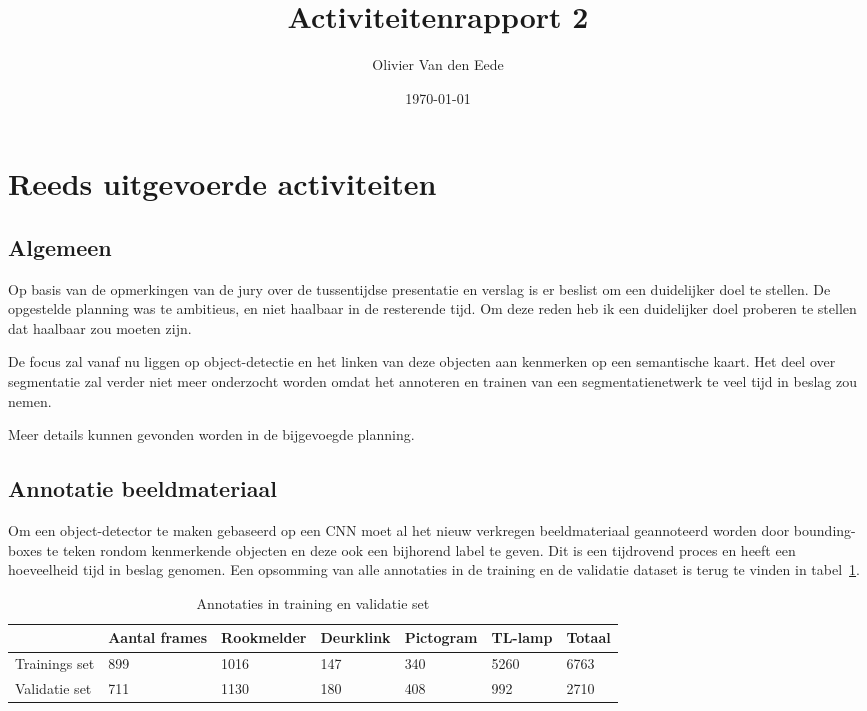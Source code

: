 \documentclass[11pt,a4paper]{article}
\title{Activiteitenrapport 2}
\author{Olivier Van den Eede}
\date{\today}
\begin{document}
    \maketitle
    
    \section{Reeds uitgevoerde activiteiten}
        \subsection{Algemeen}
            Op basis van de opmerkingen van de jury over de tussentijdse presentatie en verslag is er beslist om een duidelijker doel te stellen.
            De opgestelde planning was te ambitieus, en niet haalbaar in de resterende tijd. Om deze reden heb ik een duidelijker doel proberen te stellen dat haalbaar zou moeten zijn.

            De focus zal vanaf nu liggen op object-detectie en het linken van deze objecten aan kenmerken op een semantische kaart.
            Het deel over segmentatie zal verder niet meer onderzocht worden omdat het annoteren en trainen van een segmentatienetwerk te veel tijd in beslag zou nemen.

            Meer details kunnen gevonden worden in de bijgevoegde planning.

        \subsection{Annotatie beeldmateriaal}
            Om een object-detector te maken gebaseerd op een CNN moet al het nieuw verkregen beeldmateriaal geannoteerd worden door bounding-boxes te teken
            rondom kenmerkende objecten en deze ook een bijhorend label te geven. Dit is een tijdrovend proces en heeft een hoeveelheid tijd in beslag genomen.
            Een opsomming van alle annotaties in de training en de validatie dataset is terug te vinden in tabel~\ref{tab:annotaties}.

            \begin{table}[h]
                \caption{Annotaties in training en validatie set}\label{tab:annotaties}
                \begin{tabular}{l | l | l | l | l | l | l}
                    & Aantal frames & Rookmelder & Deurklink & Pictogram & TL-lamp & Totaal \\ \hline
                    Trainings set & 899 & 1016 & 147 & 340 & 5260 & 6763 \\
                    Validatie set & 711 & 1130 & 180 & 408 & 992 & 2710 \\
                \end{tabular}
            \end{table}
\end{document}
